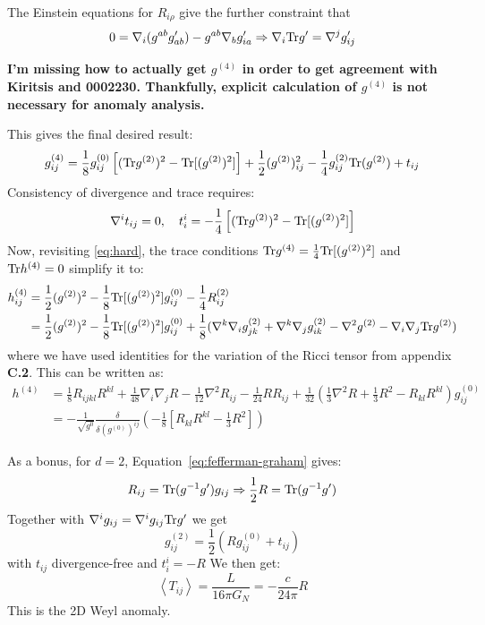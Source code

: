 \documentclass[11pt, class=article, crop=false]{standalone}
\begin{document}
\begin{enumerate}
	The Einstein equations for $R_{i\rho}$ give the further constraint that
	\[
		0 = \nabla_i (g^{ab} g'_{ab}) - g^{ab} \nabla_b g_{ia}' \Rightarrow \nabla_i \mathrm{Tr} g' = \nabla^j g'_{ij}
	\]
	
	\textbf{I'm missing how to actually get $g^{(4)}$ in order to get agreement with Kiritsis and 0002230. Thankfully, explicit calculation of $g^{(4)}$ is not necessary for anomaly analysis.}
	
	This gives the final desired result:
	\[
		g^{(4)}_{ij} = \frac18 g^{(0)}_{ij} \left[(\mathrm{Tr} g^{(2)})^2 - \mathrm{Tr}[(g^{(2)})^2]\right] + \frac12 (g^{(2)})^2_{ij} - \frac14 g_{ij}^{(2)} \mathrm{Tr}(g^{(2)}) + t_{ij}
	\]
	Consistency of divergence and trace requires:
	\[
		\nabla^i t_{ij} = 0, \quad t^i_i = -\frac14 \left[(\mathrm{Tr} g^{(2)})^2 - \mathrm{Tr}[(g^{(2)})^2]\right]
	\]
	Now, revisiting \eqref{eq:hard}, the trace conditions $\mathrm{Tr} g^{(4)} = \frac14 \mathrm{Tr}[ (g^{(2)})^2]$ and $\mathrm{Tr} h^{(4)} =0$ simplify it to:
	\[
	\begin{aligned}
		h_{ij}^{(4)} &= \frac12 (g^{(2)})^2 - \frac18 \mathrm{Tr}[(g^{(2)})^2] g^{(0)}_{ij} - \frac14 R_{ij}^{(2)}\\
		& = \frac12 (g^{(2)})^2 - \frac18 \mathrm{Tr}[(g^{(2)})^2] g^{(0)}_{ij} + \frac18 (\nabla^k \nabla_{i} g_{j k}^{(2)} + \nabla^k \nabla_{j} g_{i k}^{(2)}  - \nabla^2 g^{(2)} -\nabla_i \nabla_j \mathrm{Tr} g^{(2)})
	\end{aligned}
	\]
	where we have used identities for the variation of the Ricci tensor from appendix \textbf{C.2}. This can be written as:
	\[
	\begin{aligned}
h^{(4)}&= \frac18 R_{ijkl} R^{kl} + \frac{1}{48} \nabla_i \nabla_j R - \frac{1}{12} \nabla^2 R_{ij} - \frac{1}{24} R R_{ij} + \frac{1}{32} \left(\frac13 \nabla^2 R + \frac13 R^2 - R_{kl} R^{kl} \right) g^{(0)}_{ij}\\
&= - \frac{1}{\sqrt{g^{0}}} \frac{\delta}{\delta (g^{(0)})^{ij}} \left(- \frac18 \left[R_{kl} R^{kl} - \frac13 R^2 \right]\right)
	\end{aligned}
	\]

	
	As a bonus, for $d=2$, Equation~\eqref{eq:fefferman-graham} gives:
	\[
		R_{ij} = \Tr(g^{-1} g') g_{ij} \Rightarrow \frac12 R = \Tr(g^{-1} g') %
	\]
	Together with $\nabla^i g_{ij} = \nabla^i g_{ij} \mathrm{Tr} g'$ we get 
	\[
		g^{(2)}_{ij} = \frac12 (R g^{(0)}_{ij} + t_{ij})
	\]
	with $t_{ij}$ divergence-free and $t^i_i = - R$
	We then get:
	\[
		\left< T_{ij} \right> = \frac{L}{16 \pi G_{N}} = - \frac{c}{24 \pi} R
	\]
	This is the 2D Weyl anomaly. 
	

\end{enumerate}
\end{document}
